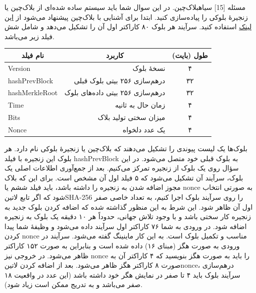 ‌مسئله [15]
‌سیاه{بلاک‌چین.}
در این سوال شما باید سیستم ساده شده‌ای از بلاک‌چین یا زنجیرهٔ بلوکی را پیاده‌سازی کنید. ابتدا برای آشنایی با بلاک‌چین پیشنهاد می‌شود از 
\href{https://blog.goodaudience.com/blockchain-for-beginners-what-is-blockchain-519db8c6677a}{این لینک}
استفاده کنید. 
سرآیند هر بلوک ۸۰ کاراکتر اول آن را تشکیل می‌دهد و شامل شش فیلد زیر می‌باشد.
\begin{center}
	\begin{tabular}{|l|r|c|}
		\hline
		\multicolumn{1}{|c|}{نام فیلد}
		& \multicolumn{1}{c|}{کاربرد}               
		& 
		طول (بایت) 
		\\		\hline		\hline
		Version        & نسخهٔ بلوک                        & ۴          \\		\hline
		hashPrevBlock  & درهم‌سازی ۲۵۶ بیتی بلوک قبلی     & ۳۲         \\		\hline
		hashMerkleRoot & درهم‌سازی ۲۵۶ بیتی داده‌های بلوک & ۳۲         \\		\hline
		Time           & زمان حال به ثانیه                & ۴          \\		\hline
		Bits           & میزان سختی تولید بلاک            & ۴          \\		\hline
		Nonce          & یک عدد دلخواه                    & ۴         
		\\		\hline
	\end{tabular}
\end{center}
بلوک‌ها یک لیست پیوندی را تشکیل می‌دهند که بلاک‌چین یا زنجیرهٔ بلوکی نام دارد. هر بلوک این زنجیره با فیلد hashPrevBlock به بلوک قبلی خود متصل می‌شود. در این سؤال روی یک بلوک از زنجیره تمرکز می‌کنیم. بعد از جمع‌آوری اطلاعات اصلی یک بلوک، سرآیند آن تشکیل می‌شود که ۵ فیلد اول آن مشخص است. برای این که بلاک مجوز اضافه شدن به زنجیره را داشته باشد، باید فیلد ششم یا nonce به صورتی انتخاب شود که اگر تابع ‌لاتین{SHA-256} را  روی سرآیند بلوک اجرا کنیم، به تعداد خاصی صفر اول آن ظاهر شود. این شرط به این منظور گذاشته شده که اضافه کردن بلوک جدید به زنجیره کار سختی باشد و با وجود تلاش جهانی، حدوداً هر ۱۰ دقیقه یک بلوک به زنجیره اضافه شود.
در ورودی به شما ۷۶ کاراکتر اول سرآیند داده می‌شود و وظیفۀ شما پیدا کردن nonce مناسب و تکمیل بلوک است.  به این کار ماینینگ گفته می‌شود. سرآیند در ورودی به صورت هگز (مبنای ۱۶) داده شده است و بنابراین به صورت ۱۵۲ کاراکتر ظاهر می‌شود. در خروجی نیز nonce را باید به صورت هگز بنویسید که ۴ کاراکتر آن به صورت ۸ کاراکتر هگز ظاهر می‌شود. بعد از اضافه کردن ‌لاتین{nonce}، درهم‌سازی سرآیند بلوک باید ۴ تا صفر در نمایش هگر خود داشته باشد (این عدد در واقعیت ۱۸ صفر می‌باشد و به تدریج ممکن است زیاد شود).

